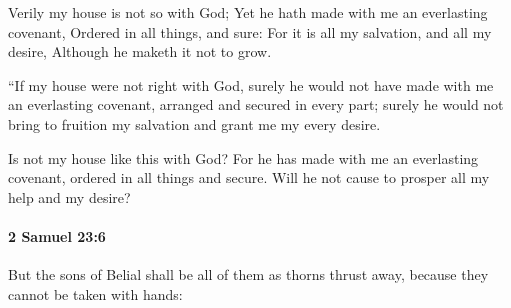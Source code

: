 			\begin{versebox}
					\item[BHS] 
					\item[ASV] Verily my house is not so with God; Yet he hath made with me an everlasting covenant, Ordered in all things, and sure: For it is all my salvation, and all my desire, Although he maketh it not to grow.
					\item[NIV] “If my house were not right with God, surely he would not have made with me an everlasting covenant, arranged and secured in every part; surely he would not bring to fruition my salvation and grant me my every desire.
					\item[NRSV] Is not my house like this with God? For he has made with me an everlasting covenant, ordered in all things and secure. Will he not cause to prosper all my help and my desire?
			\end{versebox}

		\paragraph{2 Samuel 23:6} %
			\label{2SAMUEL-23-6}

			But the sons of Belial shall be all of them as thorns thrust away, because they cannot be taken with hands:

